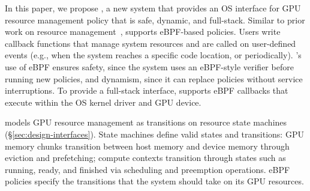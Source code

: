 In this paper, we propose \sys, a new system that provides an OS interface for GPU resource management policy that is safe, dynamic, and full-stack.
Similar to prior work on resource management~\cite{schedext-docs, zussman2025cache_ext, hoiland2018xdp}, \sys{} supports eBPF-based policies.
Users write callback functions that manage system resources and are called on user-defined events (e.g., when the system reaches a specific code location, or periodically).
\sys{}'s use of eBPF ensures safety, since the system uses an eBPF-style verifier before running new policies, and dynamism, since it can replace policies without service interruptions.
To provide a full-stack interface, \sys{} supports eBPF callbacks that execute within the OS kernel driver and GPU device.

\sys models GPU resource management as transitions on resource state machines (\S\ref{sec:design-interfaces}).
State machines define valid states and transitions: GPU memory chunks transition between host memory and device memory through eviction and prefetching; compute contexts transition through states such as running, ready, and finished via scheduling and preemption operations.
eBPF policies specify the transitions that the system should take on its GPU resources.




